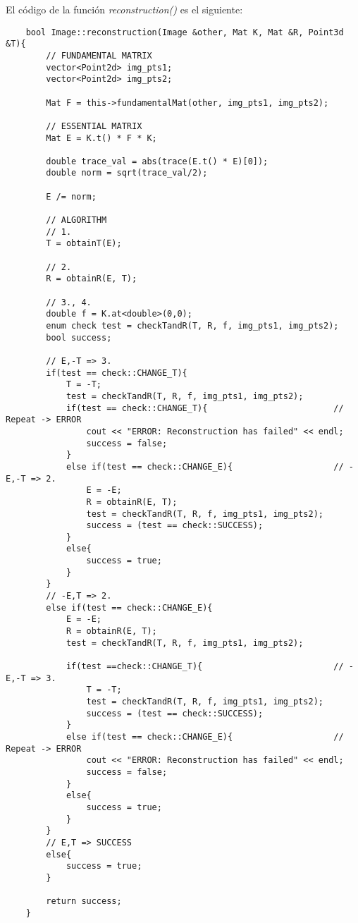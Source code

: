 \documentclass[a4paper, 11pt]{article}
\theoremstyle{definition}
\theoremstyle{theorem}
\begin{document}
    El código de la función \emph{reconstruction()} es el siguiente:
    \begin{lstlisting}
    bool Image::reconstruction(Image &other, Mat K, Mat &R, Point3d &T){
        // FUNDAMENTAL MATRIX
        vector<Point2d> img_pts1;
        vector<Point2d> img_pts2;

        Mat F = this->fundamentalMat(other, img_pts1, img_pts2);

        // ESSENTIAL MATRIX
        Mat E = K.t() * F * K;

        double trace_val = abs(trace(E.t() * E)[0]);
        double norm = sqrt(trace_val/2);

        E /= norm;

        // ALGORITHM
        // 1.
        T = obtainT(E);

        // 2.
        R = obtainR(E, T);

        // 3., 4.
        double f = K.at<double>(0,0);
        enum check test = checkTandR(T, R, f, img_pts1, img_pts2);
        bool success;

        // E,-T => 3.
        if(test == check::CHANGE_T){
            T = -T;
            test = checkTandR(T, R, f, img_pts1, img_pts2);
            if(test == check::CHANGE_T){                         // Repeat -> ERROR
                cout << "ERROR: Reconstruction has failed" << endl;
                success = false;
            }
            else if(test == check::CHANGE_E){                    // -E,-T => 2.
                E = -E;
                R = obtainR(E, T);
                test = checkTandR(T, R, f, img_pts1, img_pts2);
                success = (test == check::SUCCESS);
            }
            else{
                success = true;
            }
        }
        // -E,T => 2.
        else if(test == check::CHANGE_E){
            E = -E;
            R = obtainR(E, T);
            test = checkTandR(T, R, f, img_pts1, img_pts2);

            if(test ==check::CHANGE_T){                          // -E,-T => 3.
                T = -T;
                test = checkTandR(T, R, f, img_pts1, img_pts2);
                success = (test == check::SUCCESS);
            }
            else if(test == check::CHANGE_E){                    // Repeat -> ERROR
                cout << "ERROR: Reconstruction has failed" << endl;
                success = false;
            }
            else{
                success = true;
            }
        }
        // E,T => SUCCESS
        else{
            success = true;
        }

        return success;
    }
    \end{lstlisting}
\end{document}

